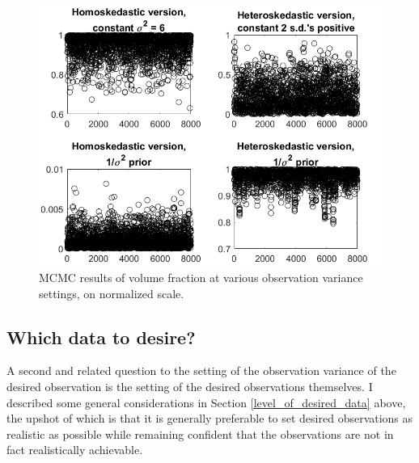 \documentclass{article}
\begin{document}
\begin{figure}[h]
\centering
\includegraphics[width=.65\linewidth]{comp_obs_var}
\captionsetup{width=.65\linewidth}
\caption{MCMC results of volume fraction at various observation variance settings, on normalized scale.}
\label{fig:comp_obs_var}
\end{figure}

\subsection{Which data to desire?}\label{which_data}

A second and related question to the setting of the observation variance of the desired observation is the setting of the desired observations themselves. I described some general considerations in Section \ref{level_of_desired_data} above, the upshot of which is that it is generally preferable to set desired observations as realistic as possible while remaining confident that the observations are not in fact realistically achievable. 
\end{document}
